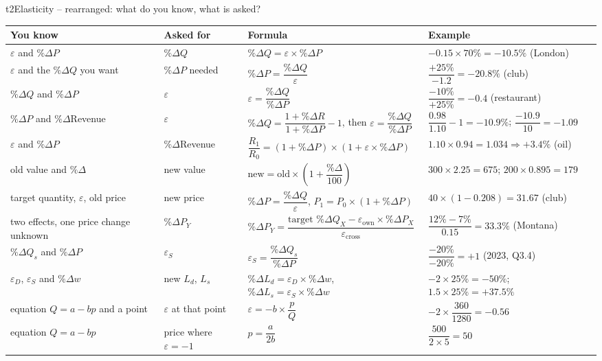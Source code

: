 \documentclass[10pt]{article}
\begin{document}
\begin{fbx}{t2}{Elasticity -- rearranged: what do you know, what is asked?}
{\small
\renewcommand{\arraystretch}{2.35}
\begin{tabularx}{\linewidth}{@{}>{\raggedright\arraybackslash}p{3.1cm}>{\raggedright\arraybackslash}p{2.3cm}>{\centering\arraybackslash}p{5.4cm}X@{}}
\textbf{You know} & \textbf{Asked for} & \textbf{Formula} & \textbf{Example}\\\midrule
$\varepsilon$ and $\%\Delta P$ & $\%\Delta Q$ &
$\%\Delta Q=\varepsilon\times\%\Delta P$ &
$-0.15\times70\%=-10.5\%$ (London)\\
$\varepsilon$ and the $\%\Delta Q$ you want & $\%\Delta P$ needed &
$\%\Delta P=\dfrac{\%\Delta Q}{\varepsilon}$ &
$\dfrac{+25\%}{-1.2}=-20.8\%$ (club)\\
$\%\Delta Q$ and $\%\Delta P$ & $\varepsilon$ &
$\varepsilon=\dfrac{\%\Delta Q}{\%\Delta P}$ &
$\dfrac{-10\%}{+25\%}=-0.4$ (restaurant)\\
$\%\Delta P$ and $\%\Delta$Revenue & $\varepsilon$ &
$\%\Delta Q=\dfrac{1+\%\Delta R}{1+\%\Delta P}-1$,\; then $\varepsilon=\dfrac{\%\Delta Q}{\%\Delta P}$ &
$\dfrac{0.98}{1.10}-1=-10.9\%$;\; $\dfrac{-10.9}{10}=-1.09$\\
$\varepsilon$ and $\%\Delta P$ & $\%\Delta$Revenue &
$\dfrac{R_1}{R_0}=(1+\%\Delta P)\times(1+\varepsilon\times\%\Delta P)$ &
$1.10\times0.94=1.034\Rightarrow+3.4\%$ (oil)\\
old value and $\%\Delta$ & new value &
$\text{new}=\text{old}\times\left(1+\dfrac{\%\Delta}{100}\right)$ &
$300\times2.25=675$;\; $200\times0.895=179$\\
target quantity, $\varepsilon$, old price & new price &
$\%\Delta P=\dfrac{\%\Delta Q}{\varepsilon}$,\; $P_1=P_0\times(1+\%\Delta P)$ &
$40\times(1-0.208)=31.67$ (club)\\
two effects, one price change unknown & $\%\Delta P_Y$ &
$\%\Delta P_Y=\dfrac{\text{target }\%\Delta Q_X-\varepsilon_{\text{own}}\times\%\Delta P_X}{\varepsilon_{\text{cross}}}$ &
$\dfrac{12\%-7\%}{0.15}=33.3\%$ (Montana)\\
$\%\Delta Q_s$ and $\%\Delta P$ & $\varepsilon_S$ &
$\varepsilon_S=\dfrac{\%\Delta Q_s}{\%\Delta P}$ &
$\dfrac{-20\%}{-20\%}=+1$ (2023, Q3.4)\\
$\varepsilon_D$, $\varepsilon_S$ and $\%\Delta w$ & new $L_d$, $L_s$ &
$\%\Delta L_d=\varepsilon_D\times\%\Delta w$,\; $\%\Delta L_s=\varepsilon_S\times\%\Delta w$ &
$-2\times25\%=-50\%$;\; $1.5\times25\%=+37.5\%$\\
equation $Q=a-bp$ and a point & $\varepsilon$ at that point &
$\varepsilon=-b\times\dfrac{p}{Q}$ &
$-2\times\dfrac{360}{1280}=-0.56$\\
equation $Q=a-bp$ & price where $\varepsilon=-1$ &
$p=\dfrac{a}{2b}$ &
$\dfrac{500}{2\times5}=50$\\
\end{tabularx}}
\par{}
\end{fbx}
\end{document}
